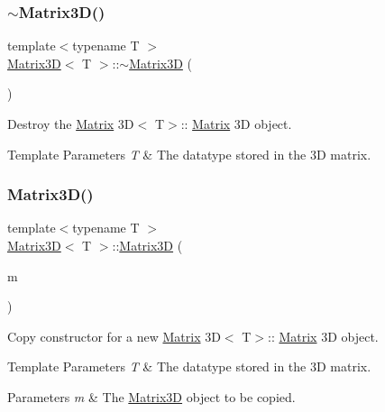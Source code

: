 \subsubsection{\texorpdfstring{$\sim$\+Matrix3\+D()}{~Matrix3D()}}
{\footnotesize\ttfamily template$<$typename T $>$ \\
\mbox{\hyperlink{classMatrix3D}{Matrix3D}}$<$ T $>$\+::$\sim$\mbox{\hyperlink{classMatrix3D}{Matrix3D}} (\begin{DoxyParamCaption}{ }\end{DoxyParamCaption})}



Destroy the \mbox{\hyperlink{classMatrix}{Matrix}} 3D$<$ T$>$\+:\+: \mbox{\hyperlink{classMatrix}{Matrix}} 3D object. 


\begin{DoxyTemplParams}{Template Parameters}
{\em T} & The datatype stored in the 3D matrix. \\
\hline
\end{DoxyTemplParams}
\mbox{\label{classMatrix3D_ae3fc93ef3456a36c92f8cbb7db01c3a9}} 
\subsubsection{\texorpdfstring{Matrix3\+D()}{Matrix3D()}\hspace{0.1cm}{\footnotesize\ttfamily [3/3]}}
{\footnotesize\ttfamily template$<$typename T $>$ \\
\mbox{\hyperlink{classMatrix3D}{Matrix3D}}$<$ T $>$\+::\mbox{\hyperlink{classMatrix3D}{Matrix3D}} (\begin{DoxyParamCaption}\item[{const \mbox{\hyperlink{classMatrix3D}{Matrix3D}}$<$ T $>$ \&}]{m }\end{DoxyParamCaption})}



Copy constructor for a new \mbox{\hyperlink{classMatrix}{Matrix}} 3D$<$ T$>$\+:\+: \mbox{\hyperlink{classMatrix}{Matrix}} 3D object. 


\begin{DoxyTemplParams}{Template Parameters}
{\em T} & The datatype stored in the 3D matrix. \\
\hline
\end{DoxyTemplParams}

\begin{DoxyParams}{Parameters}
{\em m} & The \mbox{\hyperlink{classMatrix3D}{Matrix3D}} object to be copied.\\
\hline
\end{DoxyParams}


